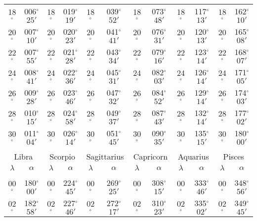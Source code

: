 \begin{table}
{\begin{tabular}{cc|cc|cc|cc|cc|cc}
18$^\circ$ & 006$^\circ$$25'$ & 18$^\circ$ & 019$^\circ$$19'$ & 18$^\circ$ & 039$^\circ$$52'$ & 18$^\circ$ & 073$^\circ$$48'$ & 18$^\circ$ & 117$^\circ$$13'$ & 18$^\circ$ & 162$^\circ$$10'$\\
20$^\circ$ & 007$^\circ$$10'$ & 20$^\circ$ & 020$^\circ$$23'$ & 20$^\circ$ & 041$^\circ$$41'$ & 20$^\circ$ & 076$^\circ$$31'$ & 20$^\circ$ & 120$^\circ$$13'$ & 20$^\circ$ & 165$^\circ$$08'$\\
22$^\circ$ & 007$^\circ$$55'$ & 22$^\circ$ & 021$^\circ$$28'$ & 22$^\circ$ & 043$^\circ$$34'$ & 22$^\circ$ & 079$^\circ$$16'$ & 22$^\circ$ & 123$^\circ$$14'$ & 22$^\circ$ & 168$^\circ$$07'$\\
24$^\circ$ & 008$^\circ$$41'$ & 24$^\circ$ & 022$^\circ$$36'$ & 24$^\circ$ & 045$^\circ$$31'$ & 24$^\circ$ & 082$^\circ$$03'$ & 24$^\circ$ & 126$^\circ$$14'$ & 24$^\circ$ & 171$^\circ$$05'$\\
26$^\circ$ & 009$^\circ$$28'$ & 26$^\circ$ & 023$^\circ$$46'$ & 26$^\circ$ & 047$^\circ$$32'$ & 26$^\circ$ & 084$^\circ$$52'$ & 26$^\circ$ & 129$^\circ$$14'$ & 26$^\circ$ & 174$^\circ$$03'$\\
28$^\circ$ & 010$^\circ$$15'$ & 28$^\circ$ & 024$^\circ$$58'$ & 28$^\circ$ & 049$^\circ$$37'$ & 28$^\circ$ & 087$^\circ$$43'$ & 28$^\circ$ & 132$^\circ$$14'$ & 28$^\circ$ & 177$^\circ$$02'$\\
30$^\circ$ & 011$^\circ$$04'$ & 30$^\circ$ & 026$^\circ$$14'$ & 30$^\circ$ & 051$^\circ$$45'$ & 30$^\circ$ & 090$^\circ$$35'$ & 30$^\circ$ & 135$^\circ$$15'$ & 30$^\circ$ & 180$^\circ$$00'$\\
\multicolumn{12}{c}{}\\
\multicolumn{2}{c}{Libra}\vline & \multicolumn{2}{c}{Scorpio} \vline& \multicolumn{2}{c}{Sagittarius} \vline& \multicolumn{2}{c}{Capricorn}\vline &
\multicolumn{2}{c}{Aquarius}\vline & \multicolumn{2}{c}{Pisces}\\\hline
$\lambda$& $\alpha$& $\lambda$& $\alpha$& $\lambda$& $\alpha$& $\lambda$& $\alpha$& $\lambda$& $\alpha$& $\lambda$& $\alpha$\\\hline
&&&&&&&&&&&\\[-2ex]
00$^\circ$ & 180$^\circ$$00'$ & 00$^\circ$ & 224$^\circ$$45'$ & 00$^\circ$ & 269$^\circ$$25'$ & 00$^\circ$ & 308$^\circ$$15'$ &  00$^\circ$ & 333$^\circ$$46'$ & 00$^\circ$ & 348$^\circ$$56'$\\
02$^\circ$ & 182$^\circ$$58'$ & 02$^\circ$ & 227$^\circ$$46'$ & 02$^\circ$ & 272$^\circ$$17'$ & 02$^\circ$ & 310$^\circ$$23'$ &  02$^\circ$ & 335$^\circ$$02'$ & 02$^\circ$ & 349$^\circ$$45'$\\

\end{tabular}}
\end{table}
